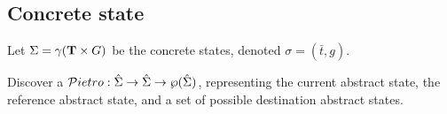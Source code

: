 \newcommand\ts{\bar{t}}


\subsection{Concrete state}
Let $\Sigma = \gamma(\mathbf{T} \times G)$ be the concrete states, denoted $\sigma = (\ts,g)$.

\newcommand\Pietrot{{\cal P}ietro}

Discover a $\Pietrot : \hat{\Sigma} \rightarrow \hat{\Sigma}
\rightarrow \wp({\hat{\Sigma}})$, representing the current abstract
state, the reference abstract state, and a set of possible destination
abstract states.




